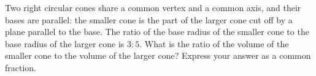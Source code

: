 Two right circular cones share a common vertex and a common axis, and their bases are parallel: the smaller cone is the part of the larger cone cut off by a plane parallel to the base. The ratio of the base radius of the smaller cone to the base radius of the larger cone is $3:5$. What is the ratio of the volume of the smaller cone to the volume of the larger cone? Express your answer as a common fraction.
